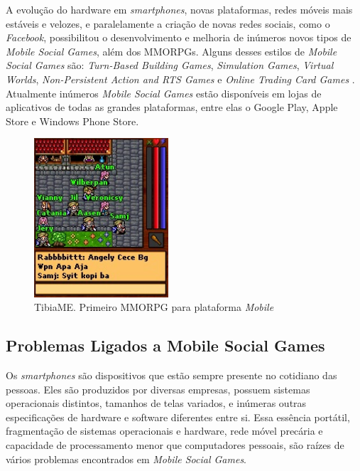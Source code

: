A evolução do hardware em \textit{smartphones}, novas plataformas, redes móveis mais estáveis e velozes, e paralelamente a criação de novas redes sociais, como o \textit{Facebook}, possibilitou o desenvolvimento e melhoria de inúmeros novos tipos de \textit{Mobile Social Games}, além dos MMORPGs. Alguns desses estilos de \textit{Mobile Social Games} são: \textit{Turn-Based Building Games}, \textit{Simulation Games}, \textit{Virtual Worlds}, \textit{Non-Persistent Action and RTS Games} e \textit{Online Trading Card Games} \cite{fields2014}. Atualmente inúmeros \textit{Mobile Social Games} estão disponíveis em lojas de aplicativos de todas as grandes plataformas, entre elas o Google Play, Apple Store e Windows Phone Store.

\begin{figure}[h]
  \centering
  \includegraphics[width=5cm]{figuras/tibiaME}
  \caption{TibiaME. Primeiro MMORPG para plataforma \textit{Mobile} \cite{tibiaMEhistory}}
  \label{figura:tibiaME}
\end{figure}

  \subsection{Problemas Ligados a Mobile Social Games}

Os \textit{smartphones} são dispositivos que estão sempre presente no cotidiano das pessoas. Eles são produzidos por diversas empresas, possuem sistemas operacionais distintos, tamanhos de telas variados, e inúmeras outras especificações de hardware e software diferentes entre si. Essa essência portátil, fragmentação de sistemas operacionais e hardware, rede móvel precária e capacidade de processamento menor que computadores pessoais, são raízes de vários problemas encontrados em \textit{Mobile Social Games}.

